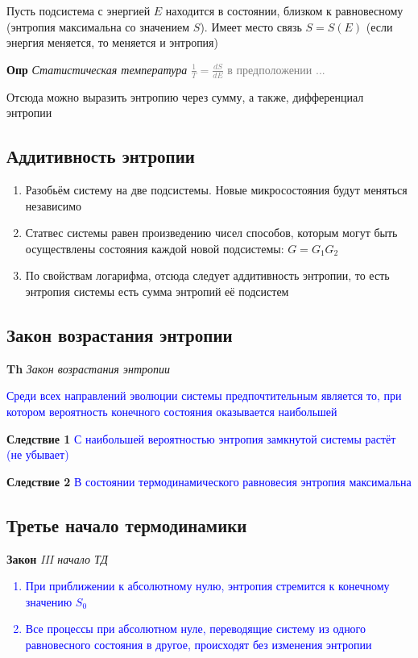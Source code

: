 \documentclass[a4paper, 14pt]{article}
\begin{document}
    Пусть подсистема с энергией $E$ находится в состоянии, близком к равновесному (энтропия максимальна со значением $S$).
    Имеет место связь $S = S(E)$ (если энергия меняется, то меняется и энтропия)
    
    \textbf{Опр} \textit{Статистическая температура} \textcolor{gray}{$\frac{1}{T} = \frac{dS}{dE}$ в предположении ...}
    
    Отсюда можно выразить энтропию через сумму, а также, дифференциал энтропии
    
    \subsection{Аддитивность энтропии}
    
    \begin{enumerate}
        \item Разобьём систему на две подсистемы.
        Новые микросостояния будут меняться независимо
        \item Статвес системы равен произведению чисел способов, которым могут быть осуществлены состояния каждой
        новой подсистемы: $G = G_1 G_2$
        \item По свойствам логарифма, отсюда следует аддитивность энтропии, то есть энтропия системы есть сумма
        энтропий её подсистем
    \end{enumerate}
    
    \subsection{Закон возрастания энтропии}
    
    \textbf{Th} \textit{Закон возрастания энтропии}
    
    \textcolor{blue}{Среди всех направлений эволюции системы предпочтительным является то, при котором вероятность
    конечного состояния оказывается наибольшей}
    
    \textbf{Следствие 1} \textcolor{blue}{С наибольшей вероятностью энтропия замкнутой системы растёт (не убывает)}
    
    \textbf{Следствие 2} \textcolor{blue}{В состоянии термодинамического равновесия энтропия максимальна}
    
    \subsection{Третье начало термодинамики}
    
    \textbf{Закон} \textit{III начало ТД}
    \textcolor{blue}{
        \begin{enumerate}
            \item При приближении к абсолютному нулю, энтропия стремится к конечному значению $S_0$
            \item Все процессы при абсолютном нуле, переводящие систему из одного равновесного состояния
            в другое, происходят без изменения энтропии
        \end{enumerate}}
    
\end{document}
